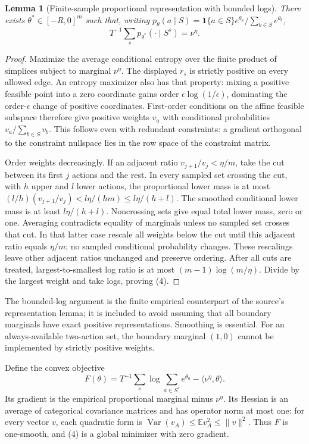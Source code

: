 \documentclass[11pt,a4paper]{article}
\newtheorem{lemma}[theorem]{Lemma}
\newcommand{\E}{\mathbb E}
\newcommand{\ind}{\mathbf1}
\DeclareMathOperator{\Var}{Var}
\begin{document}
\begin{lemma}[Finite-sample proportional representation with bounded logs]
There exists $\theta^*\in[-R,0]^m$ such that, writing
$p_\theta(a\mid S)=\ind\{a\in S\}e^{\theta_a}/\sum_{b\in S}e^{\theta_b}$,
\[
 T^{-1}\sum_sp_{\theta^*}(\cdot\mid S^s)=\nu^\eta. \tag{4}
\]
\end{lemma}
\begin{proof}
Maximize the average conditional entropy over the finite product of simplices subject to marginal $\nu^\eta$. The displayed $r_s$ is strictly positive on every allowed edge. An entropy maximizer also has that property: mixing a positive feasible point into a zero coordinate gains order $\epsilon\log(1/\epsilon)$, dominating the order-$\epsilon$ change of positive coordinates. First-order conditions on the affine feasible subspace therefore give positive weights $v_a$ with conditional probabilities $v_a/\sum_{b\in S}v_b$. This follows even with redundant constraints: a gradient orthogonal to the constraint nullspace lies in the row space of the constraint matrix.

Order weights decreasingly. If an adjacent ratio $v_{j+1}/v_j<\eta/m$, take the cut between its first $j$ actions and the rest. In every sampled set crossing the cut, with $h$ upper and $l$ lower actions, the proportional lower mass is at most $(l/h)(v_{j+1}/v_j)<l\eta/(hm)\le l\eta/(h+l)$. The smoothed conditional lower mass is at least $l\eta/(h+l)$. Noncrossing sets give equal total lower mass, zero or one. Averaging contradicts equality of marginals unless no sampled set crosses that cut. In that latter case rescale all weights below the cut until this adjacent ratio equals $\eta/m$; no sampled conditional probability changes. These rescalings leave other adjacent ratios unchanged and preserve ordering. After all cuts are treated, largest-to-smallest log ratio is at most $(m-1)\log(m/\eta)$. Divide by the largest weight and take logs, proving (4).
\end{proof}

The bounded-log argument is the finite empirical counterpart of the source's representation lemma; it is included to avoid assuming that all boundary marginals have exact positive representations. Smoothing is essential. For an always-available two-action set, the boundary marginal $(1,0)$ cannot be implemented by strictly positive weights.

Define the convex objective
\[
 F(\theta)=T^{-1}\sum_s\log\sum_{a\in S^s}e^{\theta_a}
                         -\langle\nu^\eta,\theta\rangle.
\]
Its gradient is the empirical proportional marginal minus $\nu^\eta$. Its Hessian is an average of categorical covariance matrices and has operator norm at most one: for every vector $v$, each quadratic form is $\Var(v_A)\le\E v_A^2\le\|v\|^2$. Thus $F$ is one-smooth, and (4) is a global minimizer with zero gradient.
\end{document}
